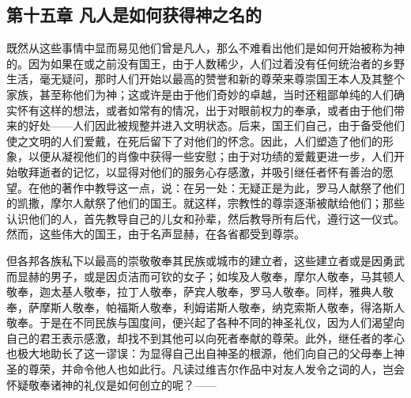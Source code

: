 \subsection{第十五章  凡人是如何获得神之名的}

既然从这些事情中显而易见他们曾是凡人，那么不难看出他们是如何开始被称为神的。因为如果在或之前没有国王，由于人数稀少，人们过着没有任何统治者的乡野生活，毫无疑问，那时人们开始以最高的赞誉和新的尊荣来尊崇国王本人及其整个家族，甚至称他们为神；这或许是由于他们奇妙的卓越，当时还粗鄙单纯的人们确实怀有这样的想法，或者如常有的情况，出于对眼前权力的奉承，或者由于他们带来的好处——人们因此被规整并进入文明状态。后来，国王们自己，由于备受他们使之文明的人们爱戴，在死后留下了对他们的怀念。因此，人们塑造了他们的形象，以便从凝视他们的肖像中获得一些安慰；由于对功绩的爱戴更进一步，人们开始敬拜逝者的记忆，以显得对他们的服务心存感激，并吸引继任者怀有善治的愿望。在他的著作中教导这一点，说：在另一处：无疑正是为此，罗马人献祭了他们的凯撒，摩尔人献祭了他们的国王。就这样，宗教性的尊崇逐渐被献给他们；那些认识他们的人，首先教导自己的儿女和孙辈，然后教导所有后代，遵行这一仪式。然而，这些伟大的国王，由于名声显赫，在各省都受到尊崇。\par

但各邦各族私下以最高的崇敬敬奉其民族或城市的建立者，这些建立者或是因勇武而显赫的男子，或是因贞洁而可钦的女子；如埃及人敬奉，摩尔人敬奉，马其顿人敬奉，迦太基人敬奉，拉丁人敬奉，萨宾人敬奉，罗马人敬奉。同样，雅典人敬奉，萨摩斯人敬奉，帕福斯人敬奉，利姆诺斯人敬奉，纳克索斯人敬奉，得洛斯人敬奉。于是在不同民族与国度间，便兴起了各种不同的神圣礼仪，因为人们渴望向自己的君王表示感激，却找不到其他可以向死者奉献的尊荣。此外，继任者的孝心也极大地助长了这一谬误：为显得自己出自神圣的根源，他们向自己的父母奉上神圣的尊荣，并命令他人也如此行。凡读过维吉尔作品中对友人发令之词的人，岂会怀疑敬奉诸神的礼仪是如何创立的呢？——\par

\par

